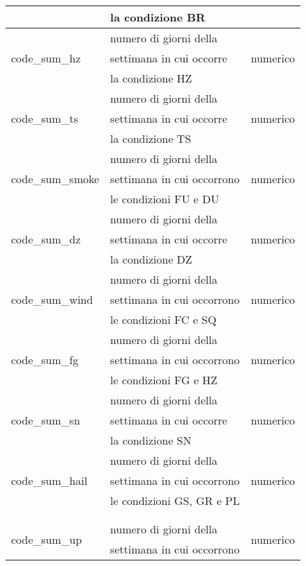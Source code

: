 \begin{longtable}{lll}
	& la condizione BR & \\ \hline	
	\multirow{3}{*}{code\_sum\_hz}	& numero di giorni della	 &  	 
	\multirow{3}{*}{numerico} \\
	& settimana in cui occorre & \\ 	 
	& la condizione HZ & \\ \hline
	\multirow{3}{*}{code\_sum\_ts}	& numero di giorni della	 & 	 
	\multirow{3}{*}{numerico} \\
	& settimana in cui occorre & \\  	 
	& la condizione TS & \\ \hline
	\multirow{3}{*}{code\_sum\_smoke}	& numero di giorni della & 	 
	\multirow{3}{*}{numerico} \\
	& settimana in cui occorrono & \\ 
	& le condizioni FU e DU & \\ \hline
	\multirow{3}{*}{code\_sum\_dz}	& numero di giorni della	 & 		
	\multirow{3}{*}{numerico} \\
	& settimana in cui occorre & \\ 	 
	& la condizione DZ & \\ \hline
	\multirow{3}{*}{code\_sum\_wind}	& numero di giorni della &	 	 
	\multirow{3}{*}{numerico} \\
	& settimana in cui occorrono & \\ 
	& le condizioni FC e SQ & \\ \hline
	\multirow{3}{*}{code\_sum\_fg}	& numero di giorni della	 &		
	\multirow{3}{*}{numerico} \\
	& settimana in cui occorrono & \\  	 
	& le condizioni FG e HZ & \\ \hline
	\multirow{3}{*}{code\_sum\_sn}	& numero di giorni della	 & 		
	\multirow{3}{*}{numerico} \\
	& settimana in cui occorre & \\ 	 
	& la condizione SN & \\ \hline
	\multirow{3}{*}{code\_sum\_hail}	& numero di giorni della & 
	\multirow{3}{*}{numerico} \\
	& settimana in cui occorrono & \\ 
	& le condizioni GS, GR e PL & \\ \hline
	\\\\ \hline
	\multirow{3}{*}{code\_sum\_up}	& numero di giorni della	 & 
	\multirow{3}{*}{numerico} \\
	& settimana in cui occorrono & \\ 	 

\end{longtable}
